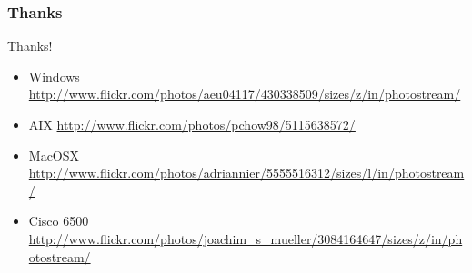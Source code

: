 \documentclass{beamer}
\begin{document}
\begin{frame}
    \frametitle{Thanks}

    \begin{block}{Thanks!}
        \begin{itemize}
            \item Windows \url{http://www.flickr.com/photos/aeu04117/430338509/sizes/z/in/photostream/}
            \item AIX \url{http://www.flickr.com/photos/pchow98/5115638572/}
            \item MacOSX \url{http://www.flickr.com/photos/adriannier/5555516312/sizes/l/in/photostream/}
            \item Cisco 6500 \url{http://www.flickr.com/photos/joachim\_s\_mueller/3084164647/sizes/z/in/photostream/}
        \end{itemize}
    \end{block}
\end{frame}
\end{document}

